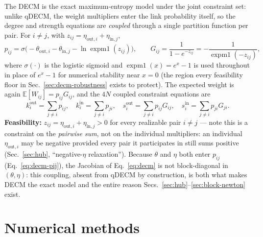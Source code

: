 \documentclass[10pt]{article}
\newcommand{\expm}{\operatorname{expm1}}
\begin{document}
The DECM is the exact maximum-entropy model under the joint constraint set:
unlike qDECM, the weight multipliers enter the link probability itself, so
the degree and strength equations are \emph{coupled} through a single
partition function per pair. For $i\ne j$, with $z_{ij} =
\eta_{\mathrm{out},i}+\eta_{\mathrm{in},j}$,
\begin{equation}
\label{eq:decm-pij}
p_{ij} = \sigma\!\big(-\theta_{\mathrm{out},i}-\theta_{\mathrm{in},j} - \ln\expm(z_{ij})\big),
\qquad
G_{ij} = \frac{1}{1-e^{-z_{ij}}} = -\frac{1}{\expm(-z_{ij})},
\end{equation}
where $\sigma(\cdot)$ is the logistic sigmoid and $\expm(x)=e^x-1$ is used
throughout in place of $e^x-1$ for numerical stability near $x=0$ (the
region every feasibility floor in Sec.~\ref{sec:decm-robustness} exists to
protect). The expected weight is again $\mathbb E[W_{ij}]=p_{ij}G_{ij}$, and
the $4N$ coupled constraint equations are
\begin{equation}
\label{eq:decm}
k^{\mathrm{out}}_i = \sum_{j\ne i} p_{ij}, \quad
k^{\mathrm{in}}_i = \sum_{j\ne i} p_{ji}, \quad
s^{\mathrm{out}}_i = \sum_{j\ne i} p_{ij}G_{ij}, \quad
s^{\mathrm{in}}_i = \sum_{j\ne i} p_{ji}G_{ji}.
\end{equation}
\textbf{Feasibility:} $z_{ij}=\eta_{\mathrm{out},i}+\eta_{\mathrm{in},j}>0$
for every realizable pair $i\ne j$ --- note this is a constraint on the
\emph{pairwise sum}, not on the individual multipliers: an individual
$\eta_{\mathrm{out},i}$ may be negative provided every pair it participates
in still sums positive (Sec.~\ref{sec:hub}, ``negative-$\eta$
relaxation''). Because $\theta$ and $\eta$ both enter $p_{ij}$
(Eq.~\ref{eq:decm-pij}), the Jacobian of Eq.~\ref{eq:decm} is not
block-diagonal in $(\theta,\eta)$: this coupling, absent from qDECM by
construction, is both what makes DECM the exact model and the entire
reason Secs.~\ref{sec:hub}--\ref{sec:block-newton} exist.

\section{Numerical methods}
\label{sec:methods}
\end{document}
